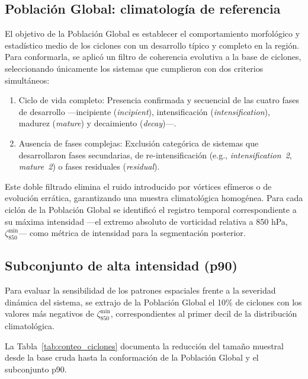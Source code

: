

\subsection{Población Global: climatología de referencia}\label{subsec:grupo_global}

El objetivo de la Población Global es establecer el comportamiento morfológico y estadístico medio de los ciclones con un desarrollo típico y completo en la región. Para conformarla, se aplicó un filtro de coherencia evolutiva a la base de ciclones, seleccionando únicamente los sistemas que cumplieron con dos criterios simultáneos:

\begin{enumerate}
    \item Ciclo de vida completo: Presencia confirmada y secuencial de las cuatro fases de desarrollo ---incipiente (\textit{incipient}), intensificación (\textit{intensification}), madurez (\textit{mature}) y decaimiento (\textit{decay})---.
    \item Ausencia de fases complejas: Exclusión categórica de sistemas que desarrollaron fases secundarias, de re-intensificación (e.g., \textit{intensification~2}, \textit{mature~2}) o fases residuales (\textit{residual}).
\end{enumerate}

Este doble filtrado elimina el ruido introducido por vórtices efímeros o de evolución errática, garantizando una muestra climatológica homogénea. Para cada ciclón de la Población Global se identificó el registro temporal correspondiente a su máxima intensidad ---el extremo absoluto de vorticidad relativa a 850 hPa, $\zeta_{850}^{\min}$--- como métrica de intensidad para la segmentación posterior.

\subsection{Subconjunto de alta intensidad (p90)}\label{subsec:subconjuntos_intensidad}

Para evaluar la sensibilidad de los patrones espaciales frente a la severidad dinámica del sistema, se extrajo de la Población Global el 10\% de ciclones con los valores más negativos de $\zeta_{850}^{\min}$, correspondientes al primer decil de la distribución climatológica.

La Tabla~\ref{tab:conteo_ciclones} documenta la reducción del tamaño muestral desde la base cruda hasta la conformación de la Población Global y el subconjunto p90.

